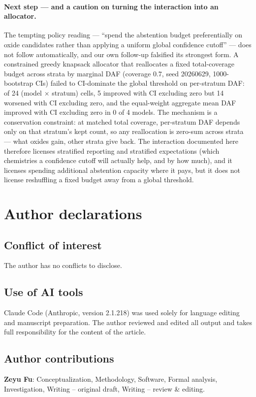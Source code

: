\documentclass[aip,jcp,preprint,superscriptaddress,amsmath,amssymb]{revtex4-2}
\begin{document}
\paragraph{Next step --- and a caution on turning the interaction into an allocator.} The
tempting policy reading --- ``spend the abstention budget preferentially on oxide candidates
rather than applying a uniform global confidence cutoff'' --- does not follow
automatically, and our own follow-up falsified its strongest form. A constrained greedy
knapsack allocator that reallocates a fixed total-coverage budget across strata by marginal
DAF (coverage $0.7$, seed 20260629, 1000-bootstrap CIs) failed to CI-dominate the global
threshold on per-stratum DAF:
of 24 (model $\times$ stratum) cells, 5 improved with CI excluding zero but 14 worsened
with CI excluding zero, and the equal-weight aggregate mean DAF improved with CI excluding
zero in 0 of 4 models. The mechanism is a conservation constraint: at matched total coverage,
per-stratum DAF depends only on that stratum's kept count, so any reallocation is zero-sum
across strata --- what oxides gain, other strata give back. The interaction documented here
therefore licenses stratified reporting and stratified expectations (which chemistries
a confidence cutoff will actually help, and by how much), and it licenses spending
additional abstention capacity where it pays, but it does not license reshuffling a
fixed budget away from a global threshold.

\section*{Author declarations}

\subsection*{Conflict of interest}
The author has no conflicts to disclose.

\subsection*{Use of AI tools}
Claude Code (Anthropic, version 2.1.218) was used solely for language editing and manuscript
preparation. The author reviewed and edited all output and takes full responsibility for the
content of the article.

\subsection*{Author contributions}
\textbf{Zeyu Fu}: Conceptualization, Methodology, Software, Formal analysis, Investigation,
Writing -- original draft, Writing -- review \& editing.
\end{document}
